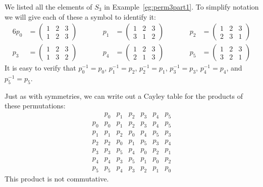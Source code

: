 \begin{example}\label{eg:perm3part2}
  We listed all the elements of $S_{3}$ in Example~\ref{eg:perm3part1}.
  To simplify notation we will give each of these a symbol to identify it:
  \begin{alignat*}{6}
    p_{0} &= \begin{pmatrix}
      1 & 2 & 3 \\
      1 & 2 & 3
    \end{pmatrix} &\qquad&
    p_{1} &= \begin{pmatrix}
      1 & 2 & 3 \\
      3 & 1 & 2
    \end{pmatrix} &\qquad&
    p_{2} &= \begin{pmatrix}
      1 & 2 & 3 \\
      2 & 3 & 1
    \end{pmatrix}\\
    p_{3} &= \begin{pmatrix}
      1 & 2 & 3 \\
      1 & 3 & 2
    \end{pmatrix} &&
    p_{4} &= \begin{pmatrix}
      1 & 2 & 3 \\
      2 & 1 & 3
    \end{pmatrix} &&
    p_{5} &= \begin{pmatrix}
      1 & 2 & 3 \\
      3 & 2 & 1
    \end{pmatrix}
  \end{alignat*}
  It is easy to verify that $p_{0}^{-1} = p_{0}$, $p_{1}^{-1} = p_{2}$,
  $p_{2}^{-1} = p_{1}$, $p_{3}^{-1} = p_{3}$, $p_{4}^{-1} = p_{4}$, 
  and $p_{5}^{-1} = p_{5}$.
  
  Just as with symmetries, we can write out a Cayley table for the products
  of these permutations:
  \[
  \begin{array}{c|cccccc}
               & p_{0} & p_{1} & p_{2} & p_{3} & p_{4} & p_{5} \\
    \hline
    p_{0} & p_{0} & p_{1} & p_{2} & p_{3} & p_{4} & p_{5} \\
    p_{1} & p_{1} & p_{2} & p_{0} & p_{4} & p_{5} & p_{3} \\
    p_{2} & p_{2} & p_{0} & p_{1} & p_{5} & p_{3} & p_{4} \\
    p_{3} & p_{3} & p_{5} & p_{4} & p_{0} & p_{2} & p_{1} \\
    p_{4} & p_{4} & p_{3} & p_{5} & p_{1} & p_{0} & p_{2} \\
    p_{5} & p_{5} & p_{4} & p_{3} & p_{2} & p_{1} & p_{0} 
  \end{array}
  \]
  This product is not commutative.
  

\end{example}
